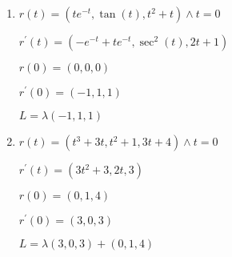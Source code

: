 \documentclass[../practica_04.tex]{subfiles}
\begin{document}
    \begin{enumerate}
        \item $r(t)=(te^{-t}, \tan(t), t^2+t) \wedge t = 0$

            $ r^{\prime}(t)= (-e^{-t} + te^{-t}, \sec^2(t), 2t+1) $

            $ r(0) = (0,0,0) $

            $ r^{\prime}(0)=(-1,1,1)$

            $ L = \lambda(-1,1,1)$

        \item $r(t)=(t^3 + 3t, t^2+1, 3t+4) \wedge t = 0$
        
            $ r^{\prime}(t) = (3t^2 + 3, 2t, 3)$

            $ r(0) = (0,1,4)$

            $ r^{\prime}(0) = (3,0,3)$

            $ L = \lambda(3,0,3) + (0,1,4)$

    \end{enumerate}
\end{document}
